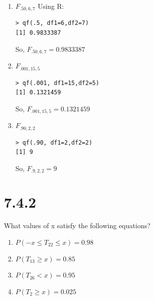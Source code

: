 \documentclass[svgnames]{article}
\begin{document}
\begin{enumerate}[label = (\alph*)]
\item $F_{.50,6,7}$
\newline
Using R:
\begin{lstlisting}
> qf(.5, df1=6,df2=7)
[1] 0.9833387
\end{lstlisting}
So,  $F_{.50,6,7} = 0.9833387$

\item $F_{.001,15,5}$
\begin{lstlisting}
> qf(.001, df1=15,df2=5)
[1] 0.1321459
\end{lstlisting}
So,  $F_{.001,15,5} = 0.1321459$

\item $F_{.90,2,2}$
\begin{lstlisting}
> qf(.90, df1=2,df2=2)
[1] 9
\end{lstlisting}
So,  $F_{.9,2,2} = 9$
\end{enumerate}


\section{7.4.2}
What values of x satisfy the following equations? 
\begin{enumerate}[label = (\alph*)]
\item $P(-x\leq T_{22} \leq x) = 0.98$
\item $P(T_{13} \geq x) = 0.85$
\item $P(T_{26} < x) = 0.95$
\item $P(T_{2} \geq x) = 0.025$
\end{enumerate}
\end{document}

